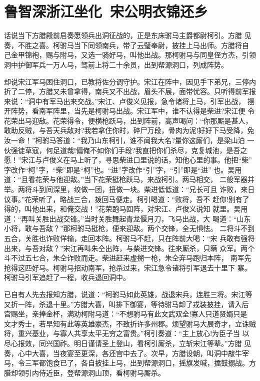\chapter{鲁智深浙江坐化~宋公明衣锦还乡}

话说当下方腊殿前启奏愿领兵出洞征战的，正是东床驸马主爵都尉柯引。方腊
见奏，不胜之喜。柯驸马当下同领南兵，带了云璧奉尉，披挂上马出师。方腊将自
己金甲锦袍，赐与附马，又选一骑好马，叫他出战。那柯驸马与同皇侄方杰，引领
洞中护御军兵一万人马，驾前上将二十余员，出到帮源洞口，列成阵势。

却说宋江军马困住洞口，已教将佐分调守护。宋江在阵中，因见手下弟兄，三停内
折了二停，方腊又未曾拿得，南兵又不出战，眉头不展，面带忧容。只听得前军报
来说：“洞中有军马出来交战。”宋江、卢俊义见报，急令诸将上马，引军出战，
摆开阵势，看南军阵里，当先是柯驸马出战。宋江军中，谁不认得是柴进?宋江便
令花荣出马迎敌。花荣得令，便横枪跃马，出到阵前，高声喝问：“你那厮是甚人，
敢助反贼，与吾天兵敌对?我若拿住你时，碎尸万段，骨肉为泥!好好下马受降，免
汝一命！”柯驸马答道：“我乃山东柯引，谁不闻我大名?量你这厮们，是梁山泊
一伙强徒草寇，何足道哉!偏俺不如你们手段?我直把你们杀尽，克复城池，是吾之
愿！”宋江与卢俊义在马上听了，寻思柴进口里说的话，知他心里的事。他把“柴”
字改作“柯”字，“柴”即是“柯”也。“进”字改作“引”字，“引”即是“进”
也。吴用道：“且看花荣与他迎敌。”当下花荣挺枪跃马，来战柯引。两马相交，
二般军器并举。两将斗到间深里，绞做一团，扭做一块。柴进低低道：“兄长可且
诈败，来日议事。”花荣听了，略战三合，拨回马便走。柯引喝道：“败将，吾不
赶你!别有了得的，叫他出来，和俺交战！”花荣跑马回阵，对宋江、卢俊义说知
就里。吴用道：“再叫关胜出战交锋。”当时关胜舞起青龙偃月刀，飞马出战，大
喝道：“山东小将，敢与吾敌？”那柯驸马挺枪，便来迎敌。两个交锋，全无惧怯。
二将斗不到五合，关胜也诈败佯输，走回本阵。柯驸马不赶，只在阵前大喝：“宋
兵敢有强将出来，与吾对敌？”宋江再叫朱仝出阵，与柴进交锋。往来厮杀，只瞒
众军。两个斗不过五七合，朱仝诈败而走。柴进赶来虚搠一枪，朱仝弃马跑归本阵，
南军先抢得这匹好马。柯驸马招动南军，抢杀过来，宋江急令诸将引军退去十里下
寨。柯驸马引军追赶了一程，收兵退回洞中。

已自有人先去报知方腊，说道：“柯驸马如此英雄，战退宋兵，连胜三将。宋江等
又折一阵，杀退十里。”方腊大喜，叫排下御宴，等待驸马卸了戎装披挂，请入后
宫赐坐，亲捧金杯，满劝柯附马道：“不想驸马有此文武双全!寡人只道贤婿只是
文才秀士，若早知有此等英雄豪杰，不致折许多州郡。烦望驸马大展奇才，立诛贼
将，重兴基业，与寡人共享太平无穷之富贵。”柯引奏道：“主上放心!为臣子当
以尽心报效，同兴国祚。明日谨请圣上登山，看柯引厮杀，立斩宋江等辈。”方腊
见奏，心中大喜，当夜宴至更深，各还宫中去了。次早，方腊设朝，叫洞中敲牛宰
马，令三军都饱食已了，各自披挂上马，出到帮源洞口，摇旗发喊，擂鼓搦战。方
腊却领引内侍近臣，登帮源洞山顶，看柯驸马厮杀。

